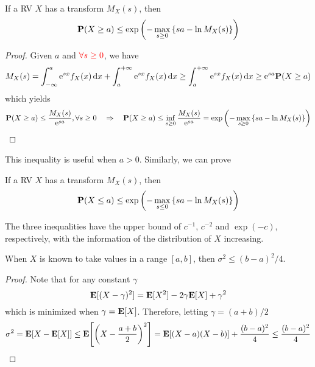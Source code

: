 \begin{theorem}
    If a RV $X$ has a transform $M_{X}(s)$, then
    \begin{equation}
        \mathbf{P}(X \geq a) \leq \exp\qty(-\max_{s \geq 0} \qty{sa - \ln M_{X}(s)})
    \end{equation}
\end{theorem}
\begin{proof}
    Given $a$ and $\textcolor{red}{\forall s \geq 0}$, we have
    \begin{equation}
        M_X(s) = \int_{-\infty}^{a} \mathrm{e}^{sx} f_X(x) \dd{x} + \int_{a}^{+\infty} \mathrm{e}^{sx} f_X(x) \dd{x} \geq \int_{a}^{+\infty} \mathrm{e}^{sx} f_X(x) \dd{x} \geq \mathrm{e}^{sa} \mathbf{P}(X \geq a)
    \end{equation}
    which yields
    \begin{equation}
        \mathbf{P}(X \geq a) \leq \frac{M_X(s)}{\mathrm{e}^{sa}}, \forall s \geq 0 \quad\Rightarrow\quad \mathbf{P}(X \geq a) \leq \inf_{s \geq 0} \frac{M_X(s)}{\mathrm{e}^{sa}} = \exp\qty(-\max_{s \geq 0} \qty{sa - \ln M_{X}(s)})
    \end{equation}
\end{proof}
This inequality is useful when $a > 0$. Similarly, we can prove
\begin{theorem}
    If a RV $X$ has a transform $M_{X}(s)$, then
    \begin{equation}
        \mathbf{P}(X \leq a) \leq \exp\qty(-\max_{s \leq 0} \qty{sa - \ln M_{X}(s)})
    \end{equation}
\end{theorem}

The three inequalities have the upper bound of $c^{-1}$, $c^{-2}$ and $\exp(-c)$, respectively, with the information of the distribution of $X$ increasing. 

\begin{example}
    When $X$ is known to take values in a range $[a, b]$, then $\sigma^2 \leq (b - a)^2/4$.
\end{example}
\begin{proof}
    Note that for any constant $\gamma$
    \begin{equation}
        \mathbf{E}[(X - \gamma)^2] = \mathbf{E}[X^2] - 2\gamma \mathbf{E}[X] + \gamma^2
    \end{equation}
    which is minimized when $\gamma = \mathbf{E}[X]$. Therefore, letting $\gamma = (a+b)/2$
    \begin{equation}
        \sigma^2 = \mathbf{E}[X - \mathbf{E}[X]] \leq \mathbf{E}\qty[\qty(X - \frac{a+b}{2})^2] = \mathbf{E}\qty[(X - a)(X - b)] + \frac{(b - a)^2}{4} \leq \frac{(b - a)^2}{4}
    \end{equation}
\end{proof}


